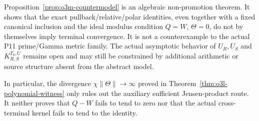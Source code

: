 \begin{remark}[R14 firewall]\label{rem:o3m-firewall}
Proposition~\ref{prop:o3m-countermodel} is an algebraic non-promotion theorem.  It shows
that the exact pullback/relative/polar identities, even together with a fixed canonical
inclusion and the ideal modulus condition $Q=W$, $\Theta=0$, do not by themselves imply
terminal convergence.  It is not a counterexample to the actual P11 prime/Gamma metric
family.  The actual asymptotic behavior of $U_R,U_S$ and $K_{R,S}^{T_0,U}$ remains open
and may still be constrained by additional arithmetic or source structure absent from
the abstract model.

In particular, the divergence
$\chi\|\Theta\|\to\infty$ proved in
Theorem~\ref{thm:o3l-polynomial-witness} only rules out the auxiliary sufficient
Jensen-product route.  It neither proves that $Q-W$ fails to tend to zero nor that the
actual cross-terminal kernel fails to tend to the identity.
\end{remark}
